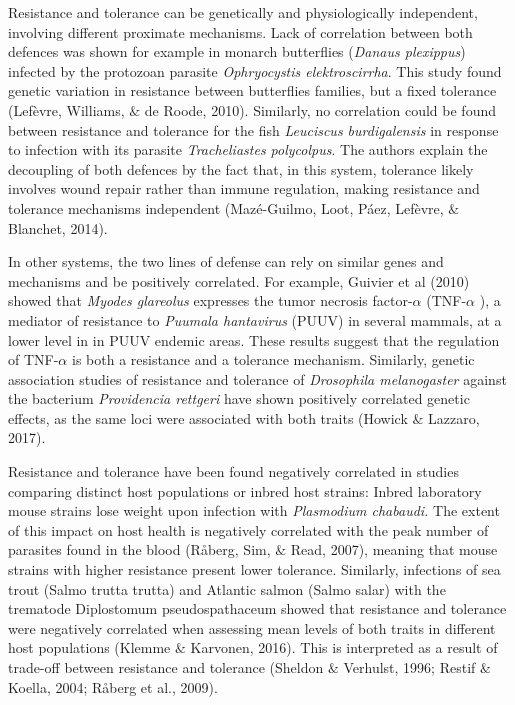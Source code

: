 \documentclass[12pt]{article}
\renewcommand{\_}{\kern-1.5pt\textunderscore\kern-1.5pt}
\begin{document}
Resistance and tolerance can be genetically and physiologically independent, involving different proximate mechanisms. Lack of correlation between both defences was shown for example in monarch butterflies (\textit{Danaus plexippus}) infected by the protozoan parasite \textit{Ophryocystis elektroscirrha}. This study found genetic variation in resistance between butterflies families, but a fixed tolerance (Lefèvre, Williams, $\&$  de Roode, 2010). Similarly, no correlation could be found between resistance and tolerance for the fish \textit{Leuciscus burdigalensis} in response to infection with its parasite \textit{Tracheliastes polycolpus}. The authors explain the decoupling of both defences by the fact that, in this system, tolerance likely involves wound repair rather than immune regulation, making resistance and tolerance mechanisms independent (Mazé-Guilmo, Loot, Páez, Lefèvre, $\&$  Blanchet, 2014).\par

In other systems, the two lines of defense can rely on similar genes and mechanisms and be positively correlated. \textcolor[HTML]{FF0000}{For example, Guivier et al (2010) showed that \textit{Myodes glareolus} expresses the tumor necrosis factor-$ \alpha $  (TNF-$ \alpha $ ), a mediator of resistance to \textit{Puumala hantavirus }(PUUV) in several mammals, at a lower level in\textit{ }in PUUV endemic areas. These results suggest that the regulation of TNF-$ \alpha $  is both a resistance and a tolerance mechanism. Similarly, genetic association studies of resistance and tolerance of \textit{Drosophila melanogaster} against the bacterium \textit{Providencia rettgeri} have shown positively correlated genetic effects, as the same loci were associated with both traits (}Howick $\&$  Lazzaro, 2017). \par

Resistance and tolerance have been found negatively correlated in studies comparing distinct host populations or inbred host strains: Inbred laboratory mouse strains lose weight upon infection with \textit{Plasmodium chabaudi.} The extent of this impact on host health is negatively correlated with the peak number of parasites found in the blood (Råberg, Sim, $\&$  Read, 2007), meaning that mouse strains with higher resistance present lower tolerance. Similarly, infections of sea trout (Salmo trutta trutta) and Atlantic salmon (Salmo salar) with the trematode Diplostomum pseudospathaceum showed that resistance and tolerance were negatively correlated when assessing mean levels of both traits in different host populations (Klemme $\&$  Karvonen, 2016). This is interpreted as a result of trade-off between resistance and tolerance (Sheldon $\&$  Verhulst, 1996; Restif $\&$  Koella, 2004; Råberg et al., 2009).\par
\end{document}
